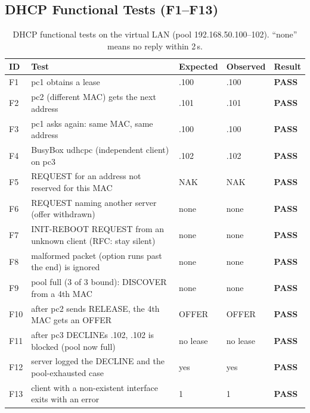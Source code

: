 \documentclass[11pt]{article}
\begin{document}
\subsection{DHCP Functional Tests (F1--F13)}
\begin{table}[H]
\centering
\small
\begin{tabular}{lp{8.3cm}lll}
\toprule
\textbf{ID} & \textbf{Test} & \textbf{Expected} & \textbf{Observed} & \textbf{Result} \\
\midrule
F1 & pc1 obtains a lease & .100 & .100 & \textbf{PASS} \\
F2 & pc2 (different MAC) gets the next address & .101 & .101 & \textbf{PASS} \\
F3 & pc1 asks again: same MAC, same address & .100 & .100 & \textbf{PASS} \\
F4 & BusyBox udhcpc (independent client) on pc3 & .102 & .102 & \textbf{PASS} \\
F5 & REQUEST for an address not reserved for this MAC & NAK & NAK & \textbf{PASS} \\
F6 & REQUEST naming another server (offer withdrawn) & none & none & \textbf{PASS} \\
F7 & INIT-REBOOT REQUEST from an unknown client (RFC: stay silent) & none & none & \textbf{PASS} \\
F8 & malformed packet (option runs past the end) is ignored & none & none & \textbf{PASS} \\
F9 & pool full (3 of 3 bound): DISCOVER from a 4th MAC & none & none & \textbf{PASS} \\
F10 & after pc2 sends RELEASE, the 4th MAC gets an OFFER & OFFER & OFFER & \textbf{PASS} \\
F11 & after pc3 DECLINEs .102, .102 is blocked (pool now full) & no lease & no lease & \textbf{PASS} \\
F12 & server logged the DECLINE and the pool-exhausted case & yes & yes & \textbf{PASS} \\
F13 & client with a non-existent interface exits with an error & 1 & 1 & \textbf{PASS} \\
\bottomrule
\end{tabular}
\caption{DHCP functional tests on the virtual LAN (pool 192.168.50.100--102). ``none''
means no reply within 2\,s.}
\label{tab:functional}
\end{table}
\end{document}
